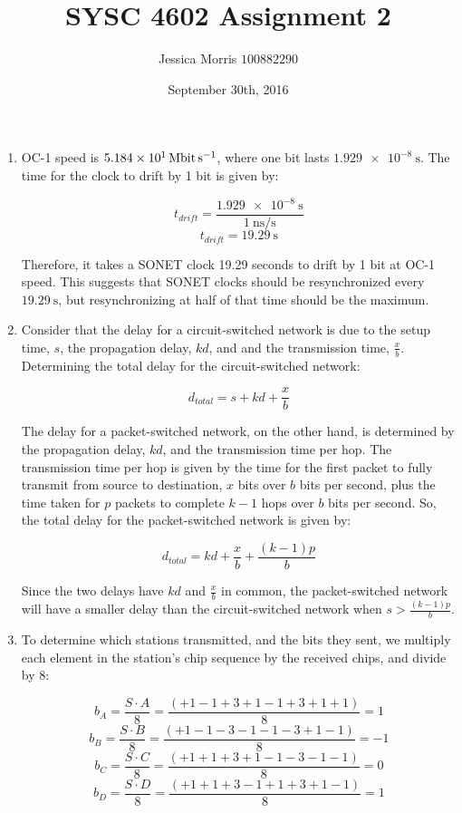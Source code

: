 \documentclass{article}
\title{SYSC 4602 Assignment 2}
\date{September 30th, 2016}
\author{Jessica Morris \(100882290\)}
\begin{document}
\maketitle

\begin{enumerate}

\item OC-1 speed is $ \SI{51.84}{\mega\bit\per\second} $, where one bit lasts $ \SI{1.929e-8}{\second} $. The time for the clock to drift by 1 bit is given by:

$$ t_{drift} = \frac{\SI{1.929e-8}{\second}}{\SI{1}{\nano\second\per\second}}$$
$$ t_{drift} = \SI{19.29}{\second} $$

Therefore, it takes a SONET clock 19.29 seconds to drift by 1 bit at OC-1 speed. This suggests that SONET clocks should be resynchronized every $ \SI{19.29}{\second} $, but resynchronizing at half of that time should be the maximum.

\item Consider that the delay for a circuit-switched network is due to the setup time, $s$, the propagation delay, $kd$, and and the transmission time, $\frac{x}{b}$. Determining the total delay for the circuit-switched network:

$$ d_{total} = s + kd + \frac{x}{b} $$

The delay for a packet-switched network, on the other hand, is determined by the propagation delay, $kd$, and the transmission time per hop. The transmission time per hop is given by the time for the first packet to fully transmit from source to destination, $x$ bits over $b$ bits per second, plus the time taken for $p$ packets to complete $k-1$ hops over $b$ bits per second. So, the total delay for the packet-switched network is given by:

$$ d_{total} = kd + \frac{x}{b} + \frac{(k-1)p}{b} $$

Since the two delays have $kd$ and $\frac{x}{b}$ in common, the packet-switched network will have a smaller delay than the circuit-switched network when $s > \frac{(k-1)p}{b}$.

\item To determine which stations transmitted, and the bits they sent, we multiply each element in the station's chip sequence by the received chips, and divide by 8:

$$ b_A = \frac{S \cdot A}{8} = \frac{(+1 -1 +3 +1 -1 +3 +1 +1)}{8} = 1 $$
$$ b_B = \frac{S \cdot B}{8} = \frac{(+1 -1 -3 -1 -1 -3 +1 -1)}{8} = -1 $$
$$ b_C = \frac{S \cdot C}{8} = \frac{(+1 +1 +3 +1 -1 -3 -1 -1)}{8} = 0 $$
$$ b_D = \frac{S \cdot D}{8} = \frac{(+1 +1 +3 -1 +1 +3 +1 -1)}{8} = 1 $$


\end{enumerate}
\end{document}
